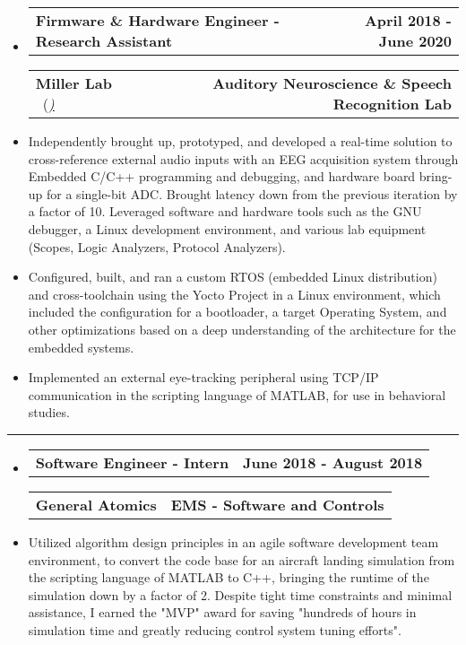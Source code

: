 \documentclass[10pt,letterpaper]{article}
\makeatletter
\newcommand{\header}[2]
{
	\begin{tabular*}{\linewidth}{l @{\extracolsep{\fill}} r}
		\hspace{-27pt} #1 & #2 \\
	\end{tabular*}
}
\makeatother
\begin{document}
\begin{itemize}
	\item[]
		\header
			{\textbf{Firmware \& Hardware Engineer - Research Assistant}} 
			{\textbf{April 2018 - June 2020}}
		\header
		{\textbf{Miller Lab} \ (\href{https://millerlab.faculty.ucdavis.edu}{\small \emph{\underline{\smash{millerlab.faculty.ucdavis.edu})}}} }
			{\textbf{Auditory Neuroscience \& Speech Recognition Lab}} 
		\item
			Independently brought up, prototyped, and developed a real-time solution to cross-reference external audio inputs with an EEG acquisition system through Embedded C/C++ programming and debugging, and hardware board bring-up for a single-bit ADC. Brought latency down from the previous iteration by a factor of 10. Leveraged software and hardware tools such as the GNU debugger, a Linux development environment, and various lab equipment (Scopes, Logic Analyzers, Protocol Analyzers). 
		\item 
			Configured, built, and ran a custom RTOS (embedded Linux distribution) and cross-toolchain using the Yocto Project in a Linux environment, which included the configuration for a bootloader, a target Operating System, and other optimizations based on a deep understanding of the architecture for the embedded systems.
		\item 
			Implemented an external eye-tracking peripheral using TCP/IP communication in the scripting language of MATLAB, for use in behavioral studies.
\end{itemize}

\hrule

\begin{itemize}
	\item[]
		\header
			{\textbf{Software Engineer - Intern}} 
			{\textbf{June 2018 - August 2018}}
		\header
			{\textbf{General Atomics}}
			{\textbf{EMS - Software and Controls}} 
		\item
			Utilized algorithm design principles in an agile software development team environment, to convert the code base for an aircraft landing simulation from the scripting language of MATLAB to C++, bringing the runtime of the simulation down by a factor of 2. Despite tight time constraints and minimal assistance, I earned the "MVP" award for saving "hundreds of hours in simulation time and greatly reducing control system tuning efforts".


\end{itemize}

\vspace{-1.5em}
\end{document}
